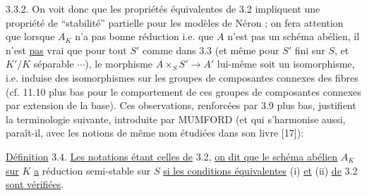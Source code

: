 3.3.2. On voit donc que les propriétés équivalentes de 3.2 impliquent
une propriété de ``stabilité'' partielle pour les modèles de Néron ; on
fera attention que lorsque $A_K$ n'a pas bonne réduction i.e. que $A$ n'est
pas un schéma abélien, il n'est \uline{pas} vrai que pour tout $S'$ comme dans
3.3 (et même pour $S'$ fini sur $S$, et $K'/K$ séparable $\cdots$), le morphisme
$A\times_S S'\longrightarrow A'$ lui-même soit un isomorphisme, i.e. induise des isomorphismes
sur les groupes de composantes connexes des fibres (cf. 11.10 plus bas
pour le comportement de ces groupes de composantes connexes par extension
de la base). Ces observations, renforcées par 3.9 plus bas, justifient
la terminologie suivante, introduite par MUMFORD (et qui s'harmonise
aussi, paraît-il, avec les notions de même nom étudiées dans son livre [17]):

\uline{Définition} 3.4. \uline{Les notations étant celles de} 3.2, \uline{on dit que le schéma
abélien} $A_K$ \uline{sur} $K$ \uline{a} réduction semi-stable sur $S$ \uline{si les conditions équivalentes} (i) \uline{et} (ii) \uline{de} 3.2 \uline{sont vérifiées}.

